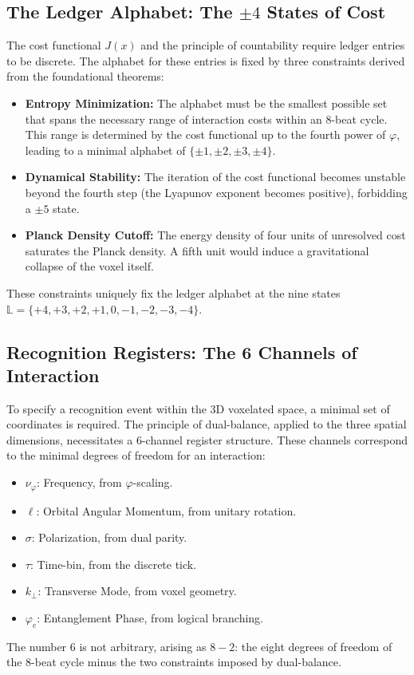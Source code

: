 \subsection{The Ledger Alphabet: The \(\pm4\) States of Cost}
The cost functional \(J(x)\) and the principle of countability require ledger entries to be discrete. The alphabet for these entries is fixed by three constraints derived from the foundational theorems:
\begin{itemize}
    \item \textbf{Entropy Minimization:} The alphabet must be the smallest possible set that spans the necessary range of interaction costs within an 8-beat cycle. This range is determined by the cost functional up to the fourth power of \(\varphi\), leading to a minimal alphabet of \(\{\pm1, \pm2, \pm3, \pm4\}\).
    \item \textbf{Dynamical Stability:} The iteration of the cost functional becomes unstable beyond the fourth step (the Lyapunov exponent becomes positive), forbidding a \(\pm5\) state.
    \item \textbf{Planck Density Cutoff:} The energy density of four units of unresolved cost saturates the Planck density. A fifth unit would induce a gravitational collapse of the voxel itself.
\end{itemize}
These constraints uniquely fix the ledger alphabet at the nine states \(\mathbb{L} = \{+4, +3, +2, +1, 0, -1, -2, -3, -4\}\).

\subsection{Recognition Registers: The 6 Channels of Interaction}
To specify a recognition event within the 3D voxelated space, a minimal set of coordinates is required. The principle of dual-balance, applied to the three spatial dimensions, necessitates a 6-channel register structure. These channels correspond to the minimal degrees of freedom for an interaction:
\begin{itemize}
    \item \(\nu_\varphi\): Frequency, from \(\varphi\)-scaling.
    \item \(\ell\): Orbital Angular Momentum, from unitary rotation.
    \item \(\sigma\): Polarization, from dual parity.
    \item \(\tau\): Time-bin, from the discrete tick.
    \item \(k_\perp\): Transverse Mode, from voxel geometry.
    \item \(\varphi_e\): Entanglement Phase, from logical branching.
\end{itemize}
The number 6 is not arbitrary, arising as \(8-2\): the eight degrees of freedom of the 8-beat cycle minus the two constraints imposed by dual-balance.

